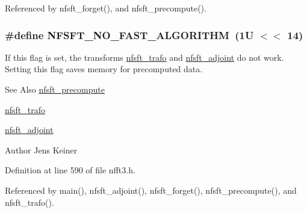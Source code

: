 Referenced by nfsft\-\_\-forget(), and nfsft\-\_\-precompute().

\hypertarget{group__nfsft_gaa228bbed7ddbbb4a15f1cd11ec27b415}{
\subsubsection[{N\-F\-S\-F\-T\-\_\-\-N\-O\-\_\-\-F\-A\-S\-T\-\_\-\-A\-L\-G\-O\-R\-I\-T\-H\-M}]{\setlength{\rightskip}{0pt plus 5cm}\#define N\-F\-S\-F\-T\-\_\-\-N\-O\-\_\-\-F\-A\-S\-T\-\_\-\-A\-L\-G\-O\-R\-I\-T\-H\-M~(1\-U $<$$<$ 14)}}\label{group__nfsft_gaa228bbed7ddbbb4a15f1cd11ec27b415}
If this flag is set, the transforms \hyperlink{group__nfsft_ga5796fc68c432d46dfcab7abd8c56ee22}{nfsft\-\_\-trafo} and \hyperlink{group__nfsft_ga813bb48d404c7286310733c99a81a169}{nfsft\-\_\-adjoint} do not work. Setting this flag saves memory for precomputed data.

\begin{DoxySeeAlso}{See Also}
\hyperlink{group__nfsft_gabe87aeea1f7cfef9ae8febb16d702f3b}{nfsft\-\_\-precompute} 

\hyperlink{group__nfsft_ga5796fc68c432d46dfcab7abd8c56ee22}{nfsft\-\_\-trafo} 

\hyperlink{group__nfsft_ga813bb48d404c7286310733c99a81a169}{nfsft\-\_\-adjoint} 
\end{DoxySeeAlso}
\begin{DoxyAuthor}{Author}
Jens Keiner 
\end{DoxyAuthor}


Definition at line 590 of file nfft3.\-h.



Referenced by main(), nfsft\-\_\-adjoint(), nfsft\-\_\-forget(), nfsft\-\_\-precompute(), and nfsft\-\_\-trafo().

